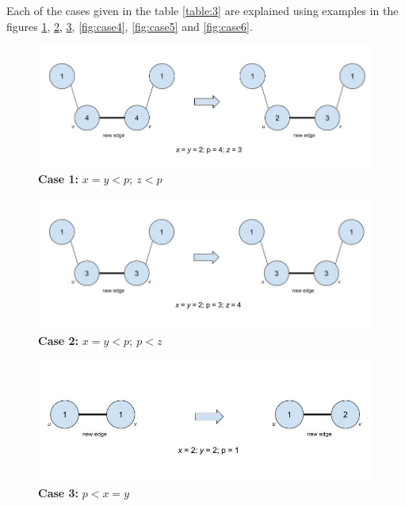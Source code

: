 \documentclass[MTech]{iitmdiss}
\begin{document}
Each of the cases given in the table \ref{table:3} are explained using examples in the figures \ref{fig:case1}, \ref{fig:case2}, \ref{fig:case3}, \ref{fig:case4}, \ref{fig:case5} and \ref{fig:case6}.

\begin{figure}[h]
    \centering
    \includegraphics[width=\textwidth,keepaspectratio=true]{case1.jpg}
    \caption{
        \textbf{Case 1:} $x=y < p; \: z<p$
    }
    \label{fig:case1}
\end{figure}

\begin{figure}[h]
    \centering
    \includegraphics[width=\textwidth,keepaspectratio=true]{case2.jpg}
    \caption{
        \textbf{Case 2:} $x=y < p; \: p<z$
    }
    \label{fig:case2}
\end{figure}

\begin{figure}[h]
    \centering
    \includegraphics[width=\textwidth,keepaspectratio=true]{case3.jpg}
    \caption{
        \textbf{Case 3:} $p < x=y$
    }
    \label{fig:case3}
\end{figure}
\end{document}
